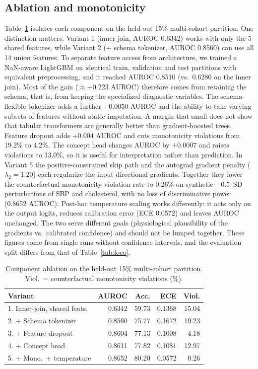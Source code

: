 \documentclass[conference]{IEEEtran}
\begin{document}
\subsection{Ablation and monotonicity}\label{sec:ablation}
Table~\ref{tab:abl} isolates each component on the held-out 15\% multi-cohort partition. One distinction matters. Variant 1 (inner join, AUROC 0.6342) works with only the 5 shared features, while Variant 2 (+ schema tokenizer, AUROC 0.8560) can use all 14 union features. To separate feature access from architecture, we trained a NaN-aware LightGBM on identical train, validation and test partitions with equivalent preprocessing, and it reached AUROC 0.8510 (vs.\ 0.6280 on the inner join). Most of the gain ($\approx$+0.223 AUROC) therefore comes from retaining the schema, that is, from keeping the specialized diagnostic variables. The schema-flexible tokenizer adds a further $+0.0050$ AUROC and the ability to take varying subsets of features without static imputation. A margin that small does not show that tabular transformers are generally better than gradient-boosted trees.
Feature dropout adds $+0.004$ AUROC and cuts monotonicity violations from 19.2\% to 4.2\%. The concept head changes AUROC by $+0.0007$ and raises violations to 13.0\%, so it is useful for interpretation rather than prediction. In Variant 5 the positive-constrained skip path and the autograd gradient penalty ($\lambda_2=1.20$) each regularize the input directional gradients. Together they lower the counterfactual monotonicity violation rate to 0.26\% on synthetic $+0.5$~SD perturbations of SBP and cholesterol, with no loss of discriminative power (0.8652 AUROC). Post-hoc temperature scaling works differently: it acts only on the output logits, reduces calibration error (ECE 0.0572) and leaves AUROC unchanged. The two serve different goals (physiological plausibility of the gradients vs.\ calibrated confidence) and should not be lumped together. These figures come from single runs without confidence intervals, and the evaluation split differs from that of Table~\ref{tab:loco}.

\begin{table}[t]
\caption{Component ablation on the held-out 15\% multi-cohort partition. Viol.\ = counterfactual monotonicity violations (\%).}
\label{tab:abl}
\centering\footnotesize
\begin{tabular}{p{2.9cm}rrrr}
\toprule
Variant & AUROC & Acc. & ECE & Viol.\\
\midrule
1. Inner-join, shared feats. & 0.6342 & 59.73 & 0.1368 & 15.04\\
2. + Schema tokenizer & 0.8560 & 75.77 & 0.1672 & 19.23\\
3. + Feature dropout & 0.8604 & 77.13 & 0.1008 & 4.18\\
4. + Concept head & 0.8611 & 77.82 & 0.1081 & 12.97\\
5. + Mono.\ + temperature & 0.8652 & 80.20 & 0.0572 & 0.26\\
\bottomrule
\end{tabular}
\end{table}
\end{document}
